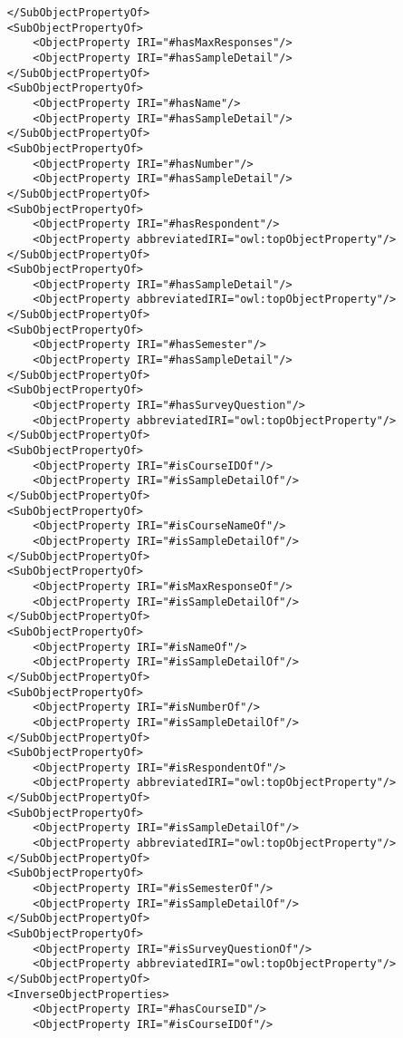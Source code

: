 \begin{lstlisting}
    </SubObjectPropertyOf>
    <SubObjectPropertyOf>
        <ObjectProperty IRI="#hasMaxResponses"/>
        <ObjectProperty IRI="#hasSampleDetail"/>
    </SubObjectPropertyOf>
    <SubObjectPropertyOf>
        <ObjectProperty IRI="#hasName"/>
        <ObjectProperty IRI="#hasSampleDetail"/>
    </SubObjectPropertyOf>
    <SubObjectPropertyOf>
        <ObjectProperty IRI="#hasNumber"/>
        <ObjectProperty IRI="#hasSampleDetail"/>
    </SubObjectPropertyOf>
    <SubObjectPropertyOf>
        <ObjectProperty IRI="#hasRespondent"/>
        <ObjectProperty abbreviatedIRI="owl:topObjectProperty"/>
    </SubObjectPropertyOf>
    <SubObjectPropertyOf>
        <ObjectProperty IRI="#hasSampleDetail"/>
        <ObjectProperty abbreviatedIRI="owl:topObjectProperty"/>
    </SubObjectPropertyOf>
    <SubObjectPropertyOf>
        <ObjectProperty IRI="#hasSemester"/>
        <ObjectProperty IRI="#hasSampleDetail"/>
    </SubObjectPropertyOf>
    <SubObjectPropertyOf>
        <ObjectProperty IRI="#hasSurveyQuestion"/>
        <ObjectProperty abbreviatedIRI="owl:topObjectProperty"/>
    </SubObjectPropertyOf>
    <SubObjectPropertyOf>
        <ObjectProperty IRI="#isCourseIDOf"/>
        <ObjectProperty IRI="#isSampleDetailOf"/>
    </SubObjectPropertyOf>
    <SubObjectPropertyOf>
        <ObjectProperty IRI="#isCourseNameOf"/>
        <ObjectProperty IRI="#isSampleDetailOf"/>
    </SubObjectPropertyOf>
    <SubObjectPropertyOf>
        <ObjectProperty IRI="#isMaxResponseOf"/>
        <ObjectProperty IRI="#isSampleDetailOf"/>
    </SubObjectPropertyOf>
    <SubObjectPropertyOf>
        <ObjectProperty IRI="#isNameOf"/>
        <ObjectProperty IRI="#isSampleDetailOf"/>
    </SubObjectPropertyOf>
    <SubObjectPropertyOf>
        <ObjectProperty IRI="#isNumberOf"/>
        <ObjectProperty IRI="#isSampleDetailOf"/>
    </SubObjectPropertyOf>
    <SubObjectPropertyOf>
        <ObjectProperty IRI="#isRespondentOf"/>
        <ObjectProperty abbreviatedIRI="owl:topObjectProperty"/>
    </SubObjectPropertyOf>
    <SubObjectPropertyOf>
        <ObjectProperty IRI="#isSampleDetailOf"/>
        <ObjectProperty abbreviatedIRI="owl:topObjectProperty"/>
    </SubObjectPropertyOf>
    <SubObjectPropertyOf>
        <ObjectProperty IRI="#isSemesterOf"/>
        <ObjectProperty IRI="#isSampleDetailOf"/>
    </SubObjectPropertyOf>
    <SubObjectPropertyOf>
        <ObjectProperty IRI="#isSurveyQuestionOf"/>
        <ObjectProperty abbreviatedIRI="owl:topObjectProperty"/>
    </SubObjectPropertyOf>
    <InverseObjectProperties>
        <ObjectProperty IRI="#hasCourseID"/>
        <ObjectProperty IRI="#isCourseIDOf"/>

\end{lstlisting}
